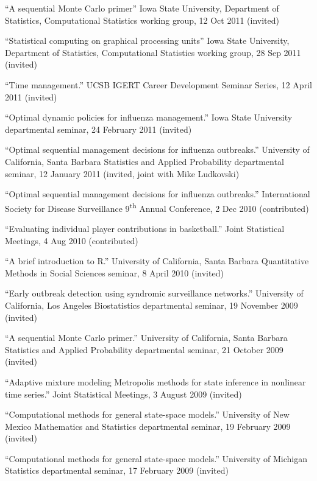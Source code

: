 \documentclass[overlapped,line]{res}
\begin{document}
\begin{resume}
{``A sequential Monte Carlo primer'' Iowa State University, Department of Statistics, Computational Statistics working group, 12 Oct 2011 (invited)


``Statistical computing on graphical processing units'' Iowa State University, Department of Statistics, Computational Statistics working group, 28 Sep 2011 (invited)

``Time management.'' UCSB IGERT Career Development Seminar Series, 12 April 2011 (invited)



``Optimal dynamic policies for influenza management.'' Iowa State University departmental seminar, 24 February 2011 (invited)

``Optimal sequential management decisions for influenza outbreaks.'' University of California, Santa Barbara Statistics and Applied Probability departmental seminar, 12 January 2011 (invited, joint with Mike Ludkovski)

``Optimal sequential management decisions for influenza outbreaks.'' International Society for Disease Surveillance 9\textsuperscript{th} Annual Conference, 2 Dec 2010 (contributed)


``Evaluating individual player contributions in basketball.'' Joint Statistical Meetings, 4 Aug 2010 (contributed)

``A brief introduction to R.'' University of California, Santa Barbara Quantitative Methods in Social Sciences seminar, 8 April 2010 (invited)

``Early outbreak detection using syndromic surveillance networks.'' University of California, Los Angeles Biostatistics departmental seminar, 19 November 2009 (invited)

``A sequential Monte Carlo primer.'' University of California, Santa Barbara Statistics and Applied Probability departmental seminar, 21 October 2009 (invited)

``Adaptive mixture modeling Metropolis methods for state inference in nonlinear time series.'' Joint Statistical Meetings, 3 August 2009 (invited)


``Computational methods for general state-space models.'' University of New Mexico Mathematics and Statistics departmental seminar, 19 February 2009 (invited)



``Computational methods for general state-space models.'' University of Michigan Statistics departmental seminar, 17 February 2009 (invited)



}
\end{resume}
\end{document}
